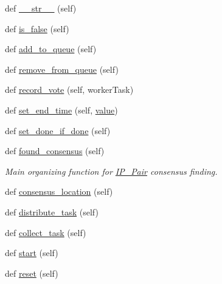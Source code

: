 \begin{DoxyCompactItemize}
\item 
def \hyperlink{classdynamicfilterapp_1_1models_1_1_i_p___pair_a23e8041ce1015febe4fdace3225714f9}{\+\_\+\+\_\+str\+\_\+\+\_\+} (self)
\item 
def \hyperlink{classdynamicfilterapp_1_1models_1_1_i_p___pair_a9ea3f5304734ea61cc64bb827a640601}{is\+\_\+false} (self)
\item 
def \hyperlink{classdynamicfilterapp_1_1models_1_1_i_p___pair_ac83cd255885b9a7b8852cd66fad6da53}{add\+\_\+to\+\_\+queue} (self)
\item 
def \hyperlink{classdynamicfilterapp_1_1models_1_1_i_p___pair_a438b59c52d810e87114f98c1996d6272}{remove\+\_\+from\+\_\+queue} (self)
\item 
def \hyperlink{classdynamicfilterapp_1_1models_1_1_i_p___pair_ad5b3eb8ce467b3f59a854be3fd0d10f1}{record\+\_\+vote} (self, worker\+Task)
\item 
def \hyperlink{classdynamicfilterapp_1_1models_1_1_i_p___pair_a162297e8bb5e9091aa3236a770e28004}{set\+\_\+end\+\_\+time} (self, \hyperlink{classdynamicfilterapp_1_1models_1_1_i_p___pair_afcc7a4b78ecd8fa7e713f8cfa0f51017}{value})
\item 
def \hyperlink{classdynamicfilterapp_1_1models_1_1_i_p___pair_a5facdfe9e351f3e0ea3126454b41f2b9}{set\+\_\+done\+\_\+if\+\_\+done} (self)
\item 
def \hyperlink{classdynamicfilterapp_1_1models_1_1_i_p___pair_a9b963fe3640eebb2f1fe833cb906a13d}{found\+\_\+consensus} (self)
\begin{DoxyCompactList}\small\item\em Main organizing function for \hyperlink{classdynamicfilterapp_1_1models_1_1_i_p___pair}{I\+P\+\_\+\+Pair} consensus finding. \end{DoxyCompactList}\item 
def \hyperlink{classdynamicfilterapp_1_1models_1_1_i_p___pair_a9a807d3f1cbfc022e836d62ee6b71477}{consensus\+\_\+location} (self)
\item 
def \hyperlink{classdynamicfilterapp_1_1models_1_1_i_p___pair_a2222560950a1e6f6b3a67c30d802c16e}{distribute\+\_\+task} (self)
\item 
def \hyperlink{classdynamicfilterapp_1_1models_1_1_i_p___pair_a7fcdd3e1ce91010e08372a2160f1ce42}{collect\+\_\+task} (self)
\item 
def \hyperlink{classdynamicfilterapp_1_1models_1_1_i_p___pair_af1af6ddf04f00f958949618f79c33b82}{start} (self)
\item 
def \hyperlink{classdynamicfilterapp_1_1models_1_1_i_p___pair_a51829b63adb24ac48d350dee60181002}{reset} (self)
\end{DoxyCompactItemize}
